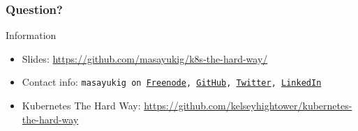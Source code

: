 \documentclass[aspectratio=169,11pt,hyperref={colorlinks=true}]{beamer}
\begin{document}
\begin{frame}
  \frametitle{Question?}
  Information
  \begin{itemize}
      \item Slides: \url{https://github.com/masayukig/k8s-the-hard-way/}
      \item Contact info: \texttt{masayukig on
        \href{https://freenode.net/}{Freenode},
        \href{https://github.com/masayukig}{GitHub},
        \href{https://twitter.com/masayukig}{Twitter},
        \href{https://www.linkedin.com/in/masayukig/}{LinkedIn}}
      \item Kubernetes The Hard Way: \url{https://github.com/kelseyhightower/kubernetes-the-hard-way}
  \end{itemize}
\end{frame}
\end{document}
